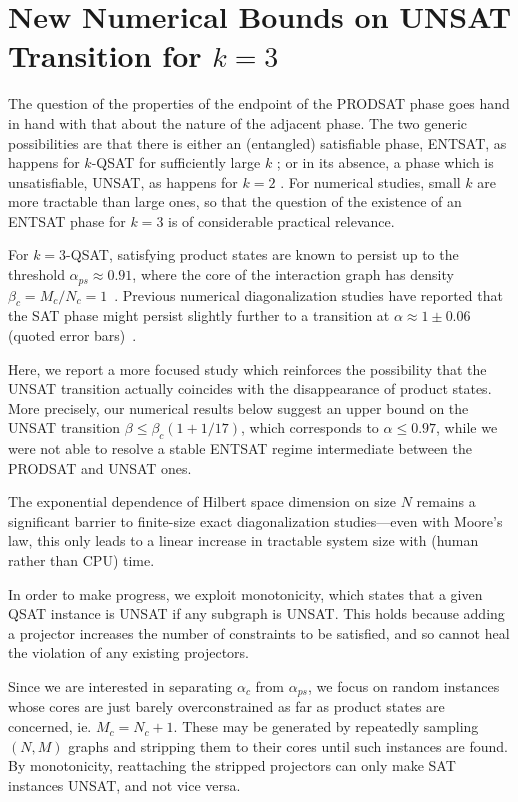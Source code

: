 \documentclass[aps,pra,twocolumn,superscriptaddress,amsmath]{revtex4-1}
\begin{document}
\section{New Numerical Bounds on UNSAT Transition for $k=3$} %
\label{sec:new_numerical_bounds_on_unsat_transition_for_}

The question of the properties of the endpoint of the PRODSAT phase goes hand in hand with that about the nature of the adjacent phase. 
The two generic possibilities are that there is either an (entangled) satisfiable phase, ENTSAT, as happens for $k$-QSAT for sufficiently large $k$ \cite{Ambainis2012,Sattath2016}; or in its absence, a phase which is unsatisfiable, UNSAT, as happens for $k=2$ \cite{LaumannQSAT2010_2}.
For numerical studies, small $k$ are more tractable than large ones, so that the question of the existence of an ENTSAT phase for $k=3$ is of considerable practical relevance. 

For $k=3$-QSAT, satisfying product states are known to persist up to the threshold $\alpha_{ps} \approx 0.91$, where the core of the interaction graph has density $\beta_c = M_{c}/N_{c} = 1$~\cite{LaumannQSAT2010}. 
Previous numerical diagonalization studies have reported that the SAT phase might persist slightly further to a transition at $\alpha \approx 1 \pm 0.06$ (quoted error bars)~\cite{LaumannQSAT2010}. 

Here, we report a more focused study which reinforces the possibility that the UNSAT transition actually coincides with the disappearance of product states. 
More precisely, our numerical results below suggest an upper bound on the UNSAT transition $\beta \le \beta_c( 1 + 1/17)$, which corresponds to $\alpha \le 0.97$, while we were not able to resolve a stable ENTSAT regime intermediate between the PRODSAT and UNSAT ones. 

The exponential dependence of Hilbert space dimension on size $N$ remains a significant barrier to finite-size exact diagonalization studies---even with Moore's law, this only leads to a linear increase in tractable system size with (human rather than CPU) time. 

In order to make progress, we exploit monotonicity, which states that a given QSAT instance is UNSAT if any subgraph is UNSAT. This holds because adding a projector increases the number of constraints to be satisfied, and so cannot heal the violation of any existing projectors.

Since we are interested in separating $\alpha_c$ from $\alpha_{ps}$, we focus on random instances whose cores are just barely overconstrained as far as product states are concerned, ie. $M_c = N_c + 1$. 
These may be generated by repeatedly sampling $(N,M)$ graphs and stripping them to their cores until such instances are found. By monotonicity, reattaching the stripped projectors can only make SAT instances UNSAT, and not vice versa. 
\end{document}

